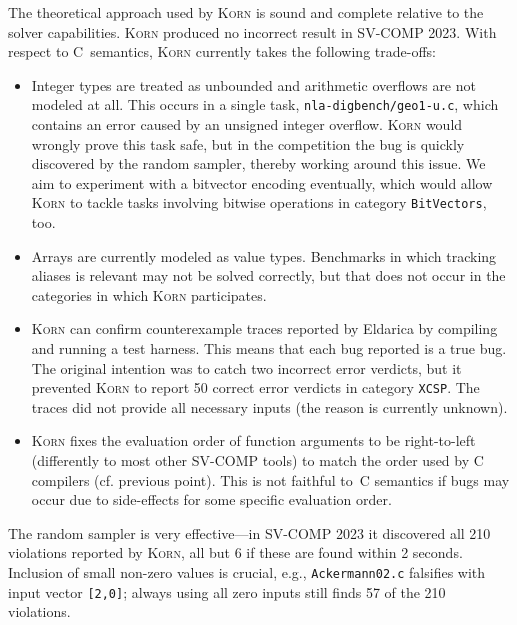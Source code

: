 \documentclass{llncs}
\newcommand{\Korn}{\textsc{Korn}\xspace}
\begin{document}
The theoretical approach used by \Korn is sound and complete
relative to the solver capabilities.
\Korn produced no incorrect result in SV-COMP 2023.
With respect to C~semantics, \Korn currently takes the following trade-offs:
\begin{itemize}
\item Integer types are treated as unbounded and arithmetic overflows are not modeled at all.
 This occurs in a single task, \texttt{nla-digbench/geo1-u.c},
 which contains an error caused by an unsigned integer overflow.
 \Korn would wrongly prove this task safe,
 but in the competition the bug is quickly discovered by the random sampler,
 thereby working around this issue.
 We aim to experiment with a bitvector encoding eventually,
 which would allow \Korn to tackle tasks involving bitwise operations in category \texttt{BitVectors}, too.
\item Arrays are currently modeled as value types.
 Benchmarks in which tracking aliases is relevant
 may not be solved correctly, but that does not occur in the categories in which \Korn participates.
\item \Korn can confirm counterexample traces reported by Eldarica by compiling and running a test harness.
 This means that each bug reported is a true bug.
 The original intention was to catch two incorrect error verdicts,
 but it prevented \Korn to report 50 correct error verdicts in category \texttt{XCSP}.
 The traces did not provide all necessary inputs (the reason is currently unknown).
\item
 \Korn fixes the evaluation order of function arguments to be right-to-left (differently to most other SV-COMP tools)
 to match the order used by C compilers (cf. previous point).
 This is not faithful to~C semantics if bugs may occur due to side-effects
 for some specific evaluation order.
\end{itemize}

The random sampler is very effective---in SV-COMP 2023 it discovered
all 210 violations reported by \Korn, all but 6 if these are found within 2 seconds.
Inclusion of small non-zero values is crucial, e.g., \texttt{Ackermann02.c}
falsifies with input vector \texttt{[2,0]};
always using all zero inputs still finds 57 of the 210 violations.
\end{document}
